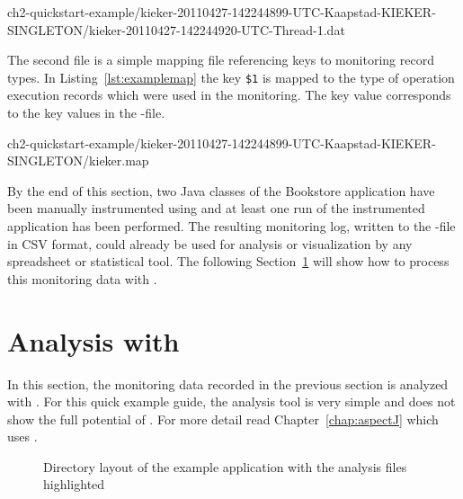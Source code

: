 \setBashListing
%
{ch2-quickstart-example/kieker-20110427-142244899-UTC-Kaapstad-KIEKER-SINGLETON/kieker-20110427-142244920-UTC-Thread-1.dat}

\noindent The second file is a simple mapping file referencing keys to monitoring record types. In Listing~\ref{lst:examplemap} the key \verb!$1! is mapped to the type of operation execution records which were used in the monitoring. The key value corresponds to the key values in the -file.

%
{ch2-quickstart-example/kieker-20110427-142244899-UTC-Kaapstad-KIEKER-SINGLETON/kieker.map}

\noindent By the end of this section, two Java classes of the Bookstore application %
have been manually instrumented using \KiekerMonitoringPart{} and at least one %
run of the instrumented application has been performed. %
The resulting monitoring log, written to the -file in CSV format, could %
already be used for analysis or visualization by any spreadsheet or %
statistical tool. %
The following Section~\ref{sec:example:analysis} will show how to process %
this monitoring data with \KiekerAnalysisPart{}. 

\section{Analysis with \KiekerAnalysisPart{}}\label{sec:example:analysis}

In this section, the monitoring data recorded in the previous section is %
analyzed with \KiekerAnalysisPart{}. %
For this quick example guide, the analysis tool is very simple and does not show %
the full potential of \Kieker{}. For more detail read Chapter~\ref{chap:aspectJ} %
which uses \KiekerTraceAnalysis{}.

\begin{figure}[H]
\begin{graybox}
\end{graybox}
\caption{Directory layout of the example application with the analysis files highlighted}
\label{lst:analysisExampleLayout}
\end{figure}

